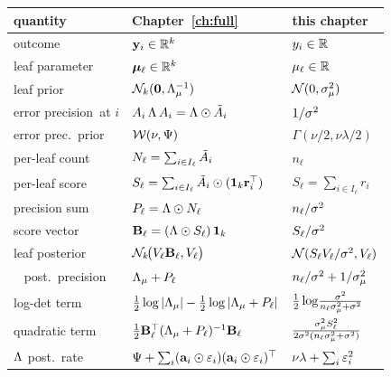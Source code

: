 \begin{center}
	\begin{tabular}{lll}
		\toprule
		quantity                & Chapter~\ref{ch:full}                                           & this chapter                                           \\
		\midrule
		outcome                 & $\mathbf{y}_i \in \mathbb{R}^k$                                                & $y_i \in \mathbb{R}$                                           \\
		leaf parameter          & $\bm{\mu}_\ell \in \mathbb{R}^k$                                            & $\mu_\ell \in \mathbb{R}$                                      \\
		leaf prior              & $\mathcal{N}_k(\mathbf{0}, \Lambda_{\mu}^{-1})$                                 & $\mathcal{N}(0, \sigma_\mu^{2})$                                         \\
		error precision\ at $i$ & $A_i\,\Lambda\,A_i = \Lambda\odot\tilde{A}_i$                   & $1/\sigma^{2}$                                             \\
		error prec.\ prior      & $\mathcal{W}(\nu, \Psi)$                                                 & $\Gamma(\nu/2,\nu\lambda/2)$                           \\
		per-leaf count          & $N_\ell = \sum_{i\in I_\ell}\tilde{A}_i$                      & $n_\ell$                                               \\
		per-leaf score          & $S_\ell = \sum_{i\in I_\ell}\tilde{A}_i\odot(\mathbf{1}_k\mathbf{r}_i^\top)$ & $S_\ell = \sum_{i\in I_\ell} r_i$                      \\
		precision sum           & $P_\ell = \Lambda\odot N_\ell$                                 & $n_\ell/\sigma^{2}$                                        \\
		score vector            & $\mathbf{B}_\ell = (\Lambda\odot S_\ell)\,\mathbf{1}_k$                        & $S_\ell/\sigma^{2}$                                        \\
		leaf posterior          & $\mathcal{N}_k\!\bigl(V_\ell\mathbf{B}_\ell, V_\ell\bigr)$                      & $\mathcal{N}(S_\ell V_\ell/\sigma^{2}, V_\ell)$                     \\
		~ post.\ precision      & $\Lambda_{\mu} + P_\ell$                                             & $n_\ell/\sigma^{2} + 1/\sigma_\mu^{2}$                              \\
		log-det term            & $\frac{1}{2}\log|\Lambda_{\mu}| - \frac{1}{2}\log|\Lambda_{\mu}+P_\ell|$  & $\frac{1}{2}\log\!\frac{\sigma^{2}}{n_\ell\sigma_\mu^{2}+\sigma^{2}}$ \\
		quadratic term          & $\frac{1}{2}\mathbf{B}_\ell^\top(\Lambda_{\mu}+P_\ell)^{-1}\mathbf{B}_\ell$       & $\frac{\sigma_\mu^{2} S_\ell^2}{2\sigma^{2}(n_\ell\sigma_\mu^{2}+\sigma^{2})}$  \\
		$\Lambda$ post.\ rate     & $\Psi + \sum_i (\mathbf{a}_i\odot\varepsilon_i)(\mathbf{a}_i\odot\varepsilon_i)^\top$     & $\nu\lambda + \sum_i \varepsilon_i^2$                        \\
		\bottomrule
	\end{tabular}
\end{center}
